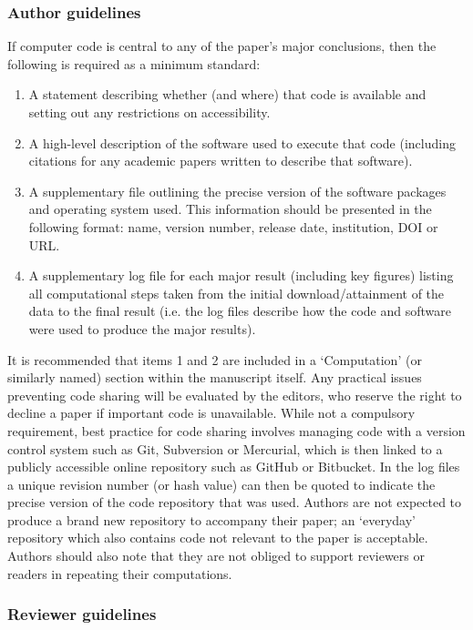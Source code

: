 \subsubsection{Author guidelines}

If computer code is central to any of the paper's major conclusions, then the following is required as a minimum standard: 
\begin{enumerate}
\item A statement describing whether (and where) that code is available and setting out any restrictions on accessibility. 
\item A high-level description of the software used to execute that code (including citations for any academic papers written to describe that software).
\item A supplementary file outlining the precise version of the software packages and operating system used. This information should be presented in the following format: name, version number, release date, institution, DOI or URL.
\item A supplementary log file for each major result (including key figures) listing all computational steps taken from the initial download/attainment of the data to the final result (i.e. the log files describe how the code and software were used to produce the major results). 
\end{enumerate}

It is recommended that items 1 and 2 are included in a `Computation' (or similarly named) section within the manuscript itself. Any practical issues preventing code sharing will be evaluated by the editors, who reserve the right to decline a paper if important code is unavailable. While not a compulsory requirement, best practice for code sharing involves managing code with a version control system such as Git, Subversion or Mercurial, which is then linked to a publicly accessible online repository such as GitHub or Bitbucket. In the log files a unique revision number (or hash value) can then be quoted to indicate the precise version of the code repository that was used. Authors are not expected to produce a brand new repository to accompany their paper; an `everyday' repository which also contains code not relevant to the paper is acceptable. Authors should also note that they are not obliged to support reviewers or readers in repeating their computations.

\subsubsection{Reviewer guidelines}

